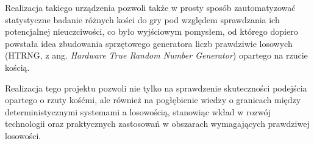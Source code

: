 Realizacja takiego urządzenia pozwoli także w prosty sposób zautomatyzować statystyczne badanie różnych
kości do gry pod względem sprawdzania ich potencjalnej nieuczciwości,
co było wyjściowym pomysłem, od którego dopiero powstała idea zbudowania sprzętowego generatora liczb prawdziwie losowych
(HTRNG, z ang. \textit{Hardware True Random Number Generator}) opartego na rzucie kością.

Realizacja tego projektu pozwoli nie tylko na sprawdzenie skuteczności podejścia opartego o rzuty kośćmi,
ale również na pogłębienie wiedzy o granicach między deterministycznymi systemami a losowością,
stanowiąc wkład w rozwój technologii oraz praktycznych zastosowań w obszarach wymagających prawdziwej losowości.


